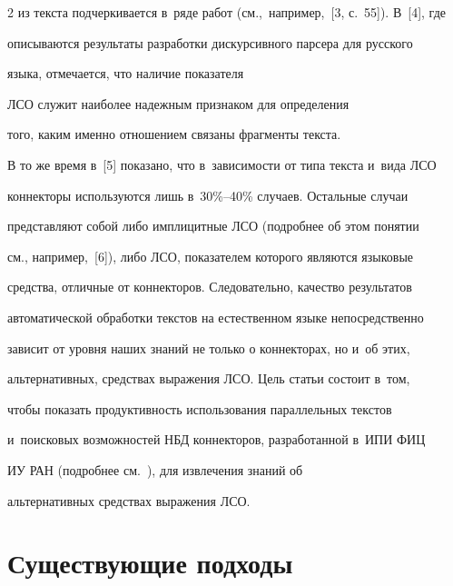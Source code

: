\begin{multicols}{2}
из текста подчеркивается в~ряде работ (см.,\ например,~[3, с.~55]). В~[4], где 


описываются результаты разработки дискурсивного парсера для русского 


языка, отмечается, что наличие показателя 


ЛСО служит наиболее надежным признаком для определения 


того, каким именно отношением связаны фрагменты текста.





В то же время в~[5] показано, что в~зависимости от типа текста и~вида ЛСО 


коннекторы используются лишь в~30\%--40\% случаев. Остальные случаи 


представляют собой либо имплицитные ЛСО (подробнее об этом понятии 


см., например,~[6]), либо ЛСО, показателем которого являются языковые 


средства, отличные от коннекторов. Следовательно, качество результатов 


автоматической обработки текстов на естественном языке непосредственно 


зависит от уровня наших знаний не только о коннекторах, но и~об этих, 


альтернативных, средствах выражения ЛСО. Цель статьи состоит в~том, 


чтобы показать продуктивность использования параллельных текстов 


и~поисковых возможностей НБД коннекторов, разработанной в~ИПИ ФИЦ 


ИУ РАН (подробнее см.~\cite{7-in, 8-in, 9-in}), для извлечения знаний об 


альтернативных средствах выражения ЛСО.





\vspace*{-8pt}





\section{Существующие подходы}





\vspace*{-1pt}






\end{multicols}

